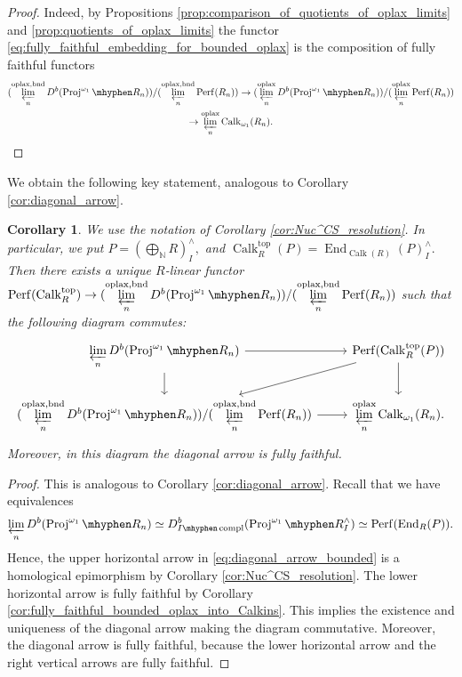 \documentclass[11pt,leqno]{amsart}
\newtheorem{cor}[theo]{Corollary}
\numberwithin{equation}{section}
\def\N{\mathbb{N}}
\def\End{\operatorname{End}}
\newcommand{\hy}{\mhyphen}
\newcommand{\prolim}[1][]{\mathop{\varprojlim}\limits_{#1}}
\newcommand{\biggplus}[1][]{\mathop{\bigoplus}\limits_{#1}}
\newcommand{\bnd}{\operatorname{bnd}}
\newcommand{\oplax}{\operatorname{oplax}}
\newcommand{\Proj}{\operatorname{Proj}}
\newcommand{\topp}{\operatorname{top}}
\newcommand{\Perf}{\operatorname{Perf}}
\newcommand{\Calk}{\operatorname{Calk}}
\newcommand{\compl}{\operatorname{compl}}
\begin{document}
\begin{proof}
Indeed, by Propositions \ref{prop:comparison_of_quotients_of_oplax_limits} and \ref{prop:quotients_of_oplax_limits} the functor \eqref{eq:fully_faithful_embedding_for_bounded_oplax} is the composition of fully faithful functors
\begin{multline*}
(\prolim[n]^{\oplax,\bnd}D^b(\Proj^{\omega_1}\hy R_n))/(\prolim[n]^{\oplax,\bnd}\Perf(R_n))\to (\prolim[n]^{\oplax}D^b(\Proj^{\omega_1}\hy R_n))/(\prolim[n]^{\oplax}\Perf(R_n))\\
\to \prolim[n]^{\oplax}\Calk_{\omega_1}(R_n).\qedhere
\end{multline*}
\end{proof}

We obtain the following key statement, analogous to Corollary \ref{cor:diagonal_arrow}.

\begin{cor}\label{cor:diagonal_arrow_bounded} We use the notation of Corollary \ref{cor:Nuc^CS_resolution}. In particular, we put $P=(\biggplus[\N]R)_I^{\wedge},$ and $\Calk_R^{\topp}(P)=\End_{\Calk(R)}(P)_I^{\wedge}.$
Then there exists a unique $R$-linear functor $\Perf(\Calk_R^{\topp})\to (\prolim[n]^{\oplax,\bnd}D^b(\Proj^{\omega_1}\hy R_n))/(\prolim[n]^{\oplax,\bnd}\Perf(R_n))$ such that the following diagram commutes:
\begin{equation}\label{eq:diagonal_arrow_bounded}
\begin{tikzcd}
\prolim[n]D^b(\Proj^{\omega_1}\hy R_n)\ar[r]\ar[d] & \Perf(\Calk_R^{\topp}(P))\ar[d]\ar[ld]\\
(\prolim[n]^{\oplax,\bnd}D^b(\Proj^{\omega_1}\hy R_n))/(\prolim[n]^{\oplax,\bnd}\Perf(R_n))\ar[r] & \prolim[n]^{\oplax}\Calk_{\omega_1}(R_n).
\end{tikzcd}
\end{equation}
Moreover, in this diagram the diagonal arrow is fully faithful.
\end{cor}

\begin{proof}
This is analogous to Corollary \ref{cor:diagonal_arrow}. Recall that we have equivalences
\begin{equation*}
\prolim[n]D^b(\Proj^{\omega_1}\hy R_n) \simeq D^b_{I\hy\compl}(\Proj^{\omega_1}\hy R^{\wedge}_I)\simeq\Perf(\End_R(P)).
\end{equation*} Hence, the upper horizontal arrow in \eqref{eq:diagonal_arrow_bounded} is a homological epimorphism by Corollary \ref{cor:Nuc^CS_resolution}. The lower horizontal arrow is fully faithful by Corollary \ref{cor:fully_faithful_bounded_oplax_into_Calkins}. This implies the existence and uniqueness of the diagonal arrow making the diagram commutative. Moreover, the diagonal arrow is fully faithful, because the lower horizontal arrow and the right vertical arrows are fully faithful. 
\end{proof}
\end{document}
